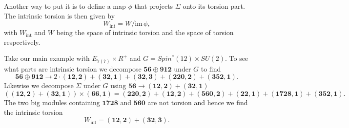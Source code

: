 Another way to put it is to define a map $\phi$ that projects $\Sigma$ onto its torsion part. The intrinsic torsion is then given by 
\begin{equation}
    W_{\text{int}} = W/\text{im}\,\phi,
\end{equation}
with $W_{\text{int}}$ and $W$ being the space of intrinsic torsion and the space of torsion respectively. 

Take our main example with $E_{7(7)}\times R^+$ and $G=Spin^*(12)\times SU(2)$. To see what parts are intrinsic torsion we decompose $\mathbf{56}\oplus\mathbf{912}$ under $G$ to find 
\begin{equation}
    \mathbf{56}\oplus\mathbf{912} \to 2\cdot (\mathbf{12},\mathbf{2})+(\mathbf{32},\mathbf{1})+(\mathbf{32},\mathbf{3})+(\mathbf{220},\mathbf{2})+(\mathbf{352},\mathbf{1}).
\end{equation}
Likewise we decompose $\Sigma$ under $G$ using $\mathbf{56}\to (\mathbf{12},\mathbf{2})+(\mathbf{32},\mathbf{1})$ 
\begin{equation}
    \left((\mathbf{12},\mathbf{2})+(\mathbf{32},\mathbf{1})\right)\times (\mathbf{66},\mathbf{1})=(\mathbf{220},\mathbf{2})+(\mathbf{12},\mathbf{2})+(\mathbf{560},\mathbf{2})+(\mathbf{22},\mathbf{1})+(\mathbf{1728},\mathbf{1})+(\mathbf{352},\mathbf{1}).
\end{equation}
The two big modules containing $\mathbf{1728}$ and $\mathbf{560}$ are not torsion and hence we find the intrinsic torsion 
\begin{equation}
    W_{\text{int}} = (\mathbf{12},\mathbf{2})+(\mathbf{32},\mathbf{3}).
\end{equation}

